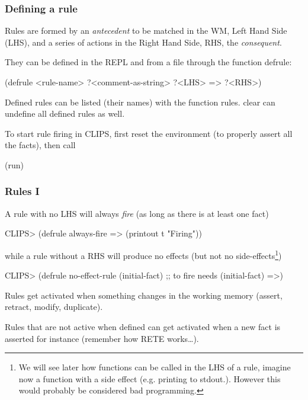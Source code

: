 \documentclass[xcolor={usenames,dvipsnames,svgnames}, compress]{beamer}
\begin{document}
\begin{frame}[fragile]
  \frametitle{Defining a rule}
  Rules are formed by an \emph{antecedent} to be matched in the WM,
  \textsf{L}eft \textsf{H}and \textsf{S}ide (LHS), and a series of
  actions in the \textsf{R}ight \textsf{H}and \textsf{S}ide,
  \textsf{RHS}, the  \emph{consequent}.\par\bigskip
  They can be defined in the
  REPL and from a file through the function \textsf{defrule}:
  \begin{clips-code}[numbers=none]
    (defrule <rule-name>
        ?<comment-as-string>
        ?<LHS>
        =>
        ?<RHS>)
  \end{clips-code}\bigskip
  
  Defined rules can be listed (their names) with the function
  \textsf{rules}. \textsf{clear} can undefine all defined rules as well.\par\bigskip
  
  To start rule firing in CLIPS, first reset the environment (to
  properly assert all the facts), then call
  \begin{clips-code}[numbers=none]
    (run)
  \end{clips-code}
  
\end{frame}

\begin{frame}[fragile]
  \frametitle{Rules I}
  A rule with no LHS will always \emph{fire} (as long as there is at
  least one fact)
  \begin{clips-code}
    CLIPS> (defrule always-fire
               =>
               (printout t "Firing"))
  \end{clips-code}
  while a rule without a RHS will produce no effects (but not no
  side-effects\footnote{We will see later how functions can be called
    in the LHS of a rule, imagine now a function with a side effect
    (e.g. printing to stdout.). However this would probably be
    considered bad programming.})
  \begin{clips-code}[firstnumber=4]
    CLIPS> (defrule no-effect-rule
               (initial-fact) ;; to fire needs (initial-fact)
               =>)
  \end{clips-code}\bigskip
  
  Rules get activated when something changes in the working memory
  (\textsf{assert}, \textsf{retract}, \textsf{modify},
  \textsf{duplicate}).\par
  Rules that are not active when defined can get activated when a new
  fact is asserted for instance (remember how RETE works\dots).
\end{frame}
\end{document}
